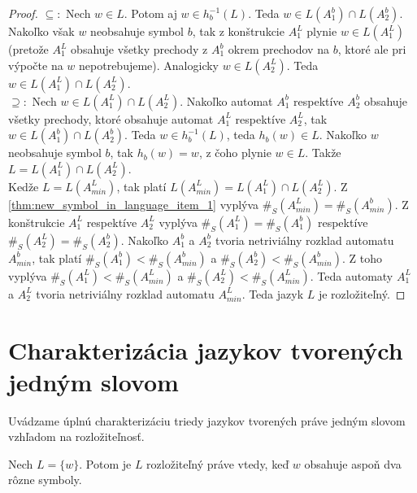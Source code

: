 \begin{proof}
$ \subseteq: $ Nech $ w \in L $. Potom aj $ w \in h_b^{-1}(L) $. Teda $ w \in L(A_1^b) \cap L(A_2^b) $. Nakoľko však $ w $ neobsahuje symbol $ b $, tak z konštrukcie $ A_1^L $ plynie $ w \in L(A_1^L) $ (pretože $ A_1^L $ obsahuje všetky prechody z $ A_1^b $ okrem prechodov na $ b $, ktoré ale pri výpočte na  $ w $ nepotrebujeme). Analogicky $ w \in L(A_2^L) $. Teda $ w \in L(A_1^L) \cap L(A_2^L) $. \\
$ \supseteq: $ Nech $ w \in L(A_1^L) \cap L(A_2^L) $. Nakoľko automat $ A_1^b $ respektíve $ A_2^b $ obsahuje všetky prechody, ktoré obsahuje automat $ A_1^L $ respektíve $ A_2^L $, tak $ w \in L(A_1^b) \cap L(A_2^b) $. Teda $ w \in h_b^{-1}(L) $, teda $ h_b(w) \in L $. Nakoľko $ w $ neobsahuje symbol $ b $, tak $ h_b(w) = w $, z čoho plynie $ w \in L $. Takže  $ L = L(A_1^L) \cap L(A_2^L) $. \\
Kedže $ L = L(A^L_{min}) $, tak platí $ L(A^L_{min}) = L(A_1^L) \cap L(A_2^L) $. Z \ref{thm:new_symbol_in_language_item_1} vyplýva $ \#_S(A^L_{min}) = \#_S(A^b_{min}) $. Z konštrukcie $ A_1^L $ respektíve $ A_2^L $ vyplýva $ \#_S(A_1^L)=\#_S(A_1^b) $ respektíve $ \#_S(A_2^L)=\#_S(A_2^b) $. Nakoľko $ A_1^b $ a $ A_2^b $ tvoria netriviálny rozklad automatu $ A^b_{min} $, tak platí $ \#_S(A_1^b) < \#_S(A^b_{min}) $ a $ \#_S(A_2^b) < \#_S(A^b_{min}) $. Z toho vyplýva $ \#_S(A_1^L) < \#_S(A^L_{min}) $ a $ \#_S(A_2^L) < \#_S(A^L_{min}) $. Teda automaty $  A_1^L $ a $ A_2^L $ tvoria netriviálny rozklad automatu $ A^L_{min} $. Teda jazyk $ L $ je rozložiteľný.
\end{proof}

\section{Charakterizácia jazykov tvorených jedným slovom}
Uvádzame úplnú charakterizáciu triedy jazykov tvorených práve jedným slovom vzhľadom na rozložiteľnosť.

\begin{theorem}
\label{thm:singleton_characterization}
Nech $ L = \lbrace w \rbrace $. Potom je $ L $ rozložiteľný práve vtedy, keď $ w $ obsahuje aspoň dva rôzne symboly.
\end{theorem}


